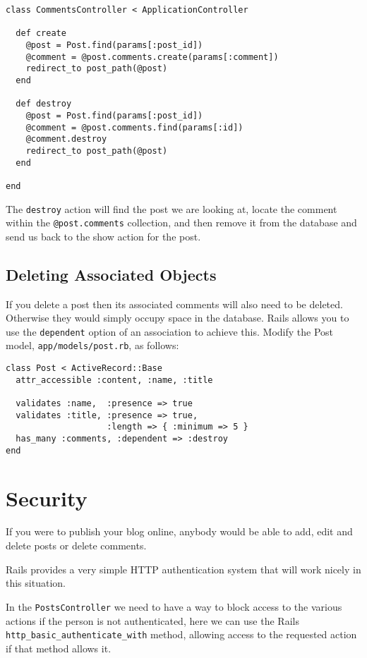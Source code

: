 \documentclass[10pt]{book}
\begin{document}
\begin{verbatim}
class CommentsController < ApplicationController
 
  def create
    @post = Post.find(params[:post_id])
    @comment = @post.comments.create(params[:comment])
    redirect_to post_path(@post)
  end
 
  def destroy
    @post = Post.find(params[:post_id])
    @comment = @post.comments.find(params[:id])
    @comment.destroy
    redirect_to post_path(@post)
  end
 
end
\end{verbatim}

The \texttt{destroy} action will find the post we are looking at, locate the comment within the \texttt{@post.comments} collection, and then remove it from the database and send us back to the show action for the post.

\subsection{ Deleting Associated Objects}

If you delete a post then its associated comments will also need to be deleted. Otherwise they would simply occupy space in the database. Rails allows you to use the \texttt{dependent} option of an association to achieve this. Modify the Post model, \texttt{app/models/post.rb}, as follows:


\begin{verbatim}
class Post < ActiveRecord::Base
  attr_accessible :content, :name, :title
 
  validates :name,  :presence => true
  validates :title, :presence => true,
                    :length => { :minimum => 5 }
  has_many :comments, :dependent => :destroy
end
\end{verbatim}

\section{ Security}

If you were to publish your blog online, anybody would be able to add, edit and delete posts or delete comments.

Rails provides a very simple HTTP authentication system that will work nicely in this situation.

In the \texttt{PostsController} we need to have a way to block access to the various actions if the person is not authenticated, here we can use the Rails \texttt{http\_basic\_authenticate\_with} method, allowing access to the requested action if that method allows it.
\end{document}
